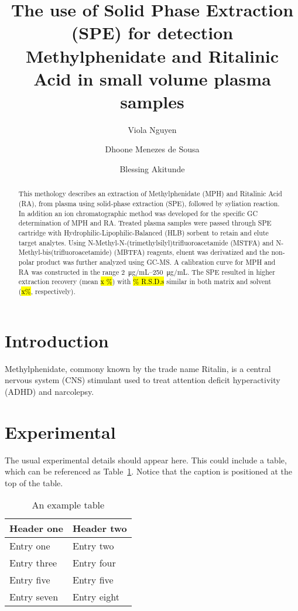 \documentclass[journal=jacsat,manuscript=article]{achemso}
\author{Viola Nguyen}
\author{Dhoone Menezes de Sousa}
\author{Blessing Akitunde}
\affiliation{Icahn School of Medicine}
\title{The use of Solid Phase Extraction (SPE) for detection Methylphenidate and Ritalinic Acid in small volume plasma samples }
\begin{document}
\begin{abstract}
This methology describes an extraction of Methylphenidate (MPH) and Ritalinic Acid (RA), from plasma using solid-phase extraction (SPE), followed by syliation reaction. In addition an ion chromatographic method was developed for the specific GC determination of MPH and RA.  Treated plasma samples were passed through SPE cartridge with Hydrophilic-Lipophilic-Balanced (HLB) sorbent to retain and elute target analytes. Using N-Methyl-N-(trimethylsilyl)trifluoroacetamide (MSTFA) and N-Methyl-bis(trifluoroacetamide) (MBTFA) reagents, eluent was derivatized and the non-polar product was further analyzed using GC-MS. A calibration curve for MPH and RA was constructed in the range  \SIrange[range-units = brackets]{2}{250}{\micro \gram/mL}. The SPE resulted in higher extraction recovery (mean \hl  {x \%}) with \hl {\% R.S.D.s} similar in both matrix and solvent (\hl {x\%}, respectively).

\end{abstract}

\section{Introduction}

Methylphenidate, commony known by the trade name Ritalin\textsuperscript{\textregistered}, is a central nervous system (CNS) stimulant used to treat attention deficit hyperactivity (ADHD) and narcolepsy. 

\section{Experimental}
The usual experimental details should appear here.  This could
include a table, which can be referenced as Table~\ref{tbl:example}.
Notice that the caption is positioned at the top of the table.
\begin{table}
  \caption{An example table}
  \label{tbl:example}
  \begin{tabular}{ll}
    \hline
    Header one  & Header two  \\
    \hline
    Entry one   & Entry two   \\
    Entry three & Entry four  \\
    Entry five  & Entry five  \\
    Entry seven & Entry eight \\
    \hline
  \end{tabular}
\end{table}
\end{document}
